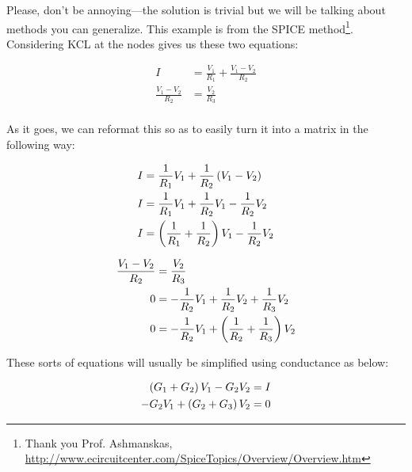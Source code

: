 Please, don't be annoying---the solution is trivial but we will be talking about methods you can generalize. This example is from the SPICE method\footnote{Thank you Prof. Ashmanskas, \url{http://www.ecircuitcenter.com/SpiceTopics/Overview/Overview.htm}}. Considering KCL at the nodes gives us these two equations:

\begin{equation} \label{lattice1}
\begin{split}
I &= \frac{V_1}{R_1} + \frac{V_1 - V_2}{R_2}\\
\frac{V_1 - V_2}{R_2} &= \frac{V_2}{R_3} \\
\end{split}
\end{equation}

As it goes, we can reformat this so as to easily turn it into a matrix in the following way: 

\begin{equation} \label{lattice2}
\begin{split}
I &= \frac{1}{R_1}V_1 + \frac{1}{R_2}\left(V_1 - V_2\right)\\
I &= \frac{1}{R_1}V_1 + \frac{1}{R_2}V_1 - \frac{1}{R_2}V_2\\
I &= \left(\frac{1}{R_1} + \frac{1}{R_2}\right)V_1 - \frac{1}{R_2}V_2\\
\end{split}
\end{equation}

\begin{equation} \label{lattice3}
\begin{split}
\frac{V_1 - V_2}{R_2} &= \frac{V_2}{R_3} \\
0 &= - \frac{1}{R_2}V_1 + \frac{1}{R_2}V_2 + \frac{1}{R_3}V_2 \\
0 &= - \frac{1}{R_2}V_1 + \left(\frac{1}{R_2} + \frac{1}{R_3}\right)V_2 \\
\end{split}
\end{equation}

These sorts of equations will usually be simplified using conductance as below: 

\begin{equation} \label{lattice4}
\begin{split}
\left(G_1 + G_2\right)V_1 - G_2V_2 &= I\\
- G_2V_1 + \left(G_2 + G_3\right)V_2 &= 0 \\
\end{split}
\end{equation}

